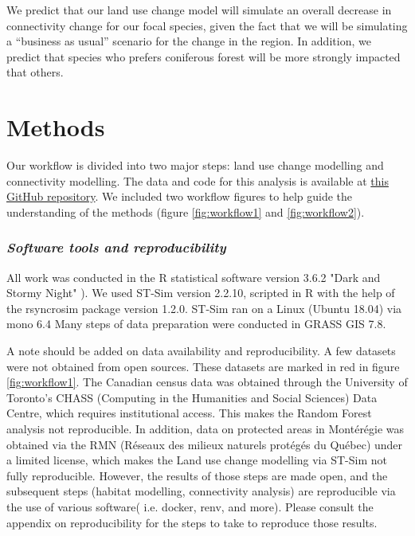 We predict that our land use change model will simulate an overall decrease in connectivity change for our focal species, given the fact that we will be simulating a “business as usual” scenario for the change in the region. In addition, we predict that species who prefers coniferous forest will be more strongly impacted that others.\\ %

\section{Methods}

Our workflow is divided into two major steps: land use change modelling and connectivity modelling. The data and code for this analysis is available at \href{https://github.com/VLucet/landchange-connectivity-Montérégie}{this GitHub repository}. We included two workflow figures to help guide the understanding of the methods (figure \ref{fig:workflow1} and \ref{fig:workflow2}). \\

\subsubsection*{\textit{Software tools and reproducibility}}

All work was conducted in the R statistical software version 3.6.2 "Dark and Stormy Night" \citep[see][]{R}). We used ST-Sim version 2.2.10, scripted in R with the help of the rsyncrosim package version 1.2.0. ST-Sim ran on a Linux (Ubuntu 18.04) via mono 6.4 Many steps of data preparation were conducted in GRASS GIS 7.8. 

A note should be added on data availability and reproducibility. A few datasets were not obtained from open sources. These datasets are marked in red in figure \ref{fig:workflow1}. The Canadian census data was obtained through the University of Toronto's CHASS (Computing in the Humanities and Social Sciences) Data Centre, which requires institutional access. This makes the Random Forest analysis not reproducible. In addition, data on protected areas in Montérégie was obtained  via the RMN (Réseaux des milieux naturels protégés du Québec) under a limited license, which makes the Land use change modelling via ST-Sim not fully reproducible. However, the results of those steps are made open, and the subsequent steps (habitat modelling, connectivity analysis) are reproducible via the use of various software( i.e. docker, renv, and more). Please consult the appendix on reproducibility for the steps to take to reproduce those results. \\ %

